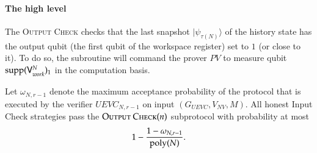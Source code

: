 \documentclass[11pt,letterpaper]{article}
\newcommand{\ket}[1]{|#1\rangle}
\newcommand{\sR}{{\mathsf{R}}}
\newcommand{\sV}{{\mathsf{V}}}
\begin{document}
\paragraph{The high level} The \textsc{Output Check} checks that the last snapshot $\ket{\psi_{\tau(N)}}$ of the history state has the output qubit (the first qubit of the workspace register) set to $1$ (or close to it). To do so, the subroutine will command the prover $PV$ to measure  qubit $\supp(\sV^N_{work})_1$ in the computation basis. 



\begin{theorem}	
\label{thm:output_check}
Let $\omega_{N,r-1}$ denote the maximum acceptance probability of the protocol that is executed by the verifier $UEVC_{N,r-1}$ on input $(G_{UEVC},V_{NV},M)$. All honest Input Check strategies pass the $\textsc{Output Check}(n)$ subprotocol with probability at most 
\[
	1 - \frac{1 - \omega_{N,r-1}}{\operatorname{poly}(N)}.
\] %
\end{theorem}






\end{document}
